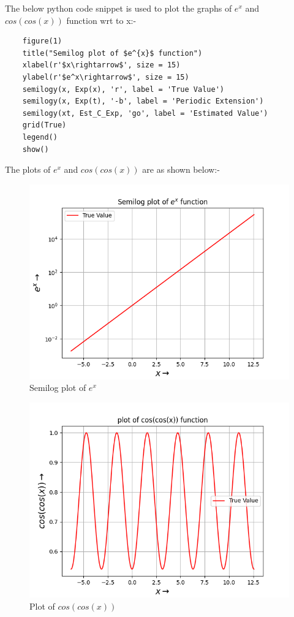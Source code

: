 \documentclass[11pt, a4paper]{article}
\begin{document}
The below python code snippet is used to plot the graphs of $e^{x}$ and $cos(cos(x))$ function wrt to x:- 
\begin{verbatim}
    figure(1) 
    title("Semilog plot of $e^{x}$ function")
    xlabel(r'$x\rightarrow$', size = 15)
    ylabel(r'$e^x\rightarrow$', size = 15)	
    semilogy(x, Exp(x), 'r', label = 'True Value')	
    semilogy(x, Exp(t), '-b', label = 'Periodic Extension')	
    semilogy(xt, Est_C_Exp, 'go', label = 'Estimated Value') 
    grid(True) 
    legend() 
    show()

\end{verbatim}
The plots of $e^{x}$ and $cos(cos(x))$ are as shown below:-
   \begin{figure}[!tbh]
   	\centering
   	\includegraphics[scale=0.5]{Ass4_Figure_1.png}   
   	\caption{Semilog plot of $e^x$}
   	\label{fig:sample}
   \end{figure}



   
   \begin{figure}[!h]
   	\centering
   	\includegraphics[scale=0.5]{Ass4_Figure_1.1.png}   
   	\caption{Plot of $cos(cos(x))$}
   	\label{fig:sample}
   \end{figure} 
   
\end{document}
